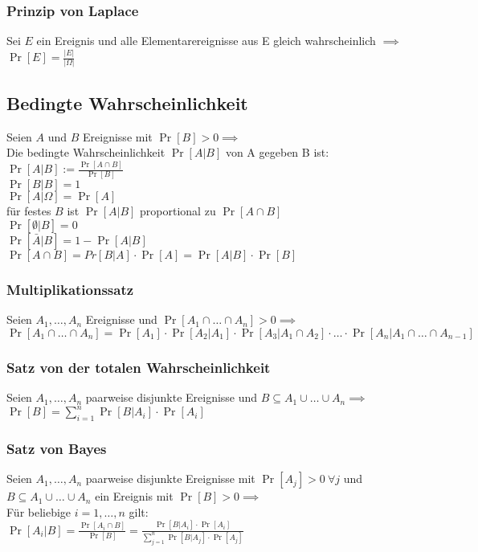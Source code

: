 \documentclass[a4paper,9pt]{extarticle}
\begin{document}
\subsubsection*{Prinzip von Laplace}
Sei $E$ ein Ereignis und alle Elementarereignisse aus E gleich wahrscheinlich $\implies$
$\Pr[E] = \frac{|E|}{|\Omega|}$

\subsection*{Bedingte Wahrscheinlichkeit}
Seien $A$ und $B$ Ereignisse mit $\Pr[B] > 0 \implies$ \\
Die bedingte Wahrscheinlichkeit $\Pr[A|B]$ von A gegeben B ist: \\
$\Pr[A|B] := \frac{\Pr[A \cap B]}{\Pr[B]}$ \\

$\Pr[B|B] = 1$ \\
$\Pr[A|\Omega] = \Pr[A]$ \\
für festes $B$ ist $\Pr[A|B]$ proportional zu $\Pr[A \cap B]$ \\
$\Pr[∅|B] = 0$ \\
$\Pr[\bar{A}|B] = 1 - \Pr[A|B]$ \\
$\Pr[A \cap B] = Pr[B|A] ⋅ \Pr[A] = \Pr[A|B] ⋅ \Pr[B]$

\subsubsection*{Multiplikationssatz}
Seien $A_1, \dots, A_n$ Ereignisse und $\Pr[A_1 \cap \dots \cap A_n] > 0 \implies$
$\Pr[A_1 \cap \dots \cap A_n] = \Pr[A_1] ⋅ \Pr[A_2|A_1] ⋅ \Pr[A_3|A_1 \cap A_2] ⋅ \dots ⋅ \Pr[A_n|A_1 \cap \dots \cap A_{n-1}]$

\subsubsection*{Satz von der totalen Wahrscheinlichkeit}
Seien $A_1, \dots, A_n$ paarweise disjunkte Ereignisse und $B \subseteq A_1 \cup \dots \cup A_n \implies$
$\Pr[B] = \sum_{i=1}^{n} \Pr[B|A_i] ⋅ \Pr[A_i]$

\subsubsection*{Satz von Bayes}
Seien $A_1, \dots, A_n$ paarweise disjunkte Ereignisse mit $\Pr[A_j] > 0 ~ \forall j$ und $B \subseteq A_1 \cup \dots \cup A_n$ ein Ereignis mit $\Pr[B] > 0 \implies$ \\
Für beliebige $i = 1, \dots, n$ gilt: \\
$\Pr[A_i|B] = \frac{\Pr[A_i \cap B]}{\Pr[B]} = \frac{\Pr[B|A_i] ⋅ \Pr[A_i]}{\sum_{j=1}^n \Pr[B|A_j] ⋅ \Pr[A_j]}$
\end{document}
